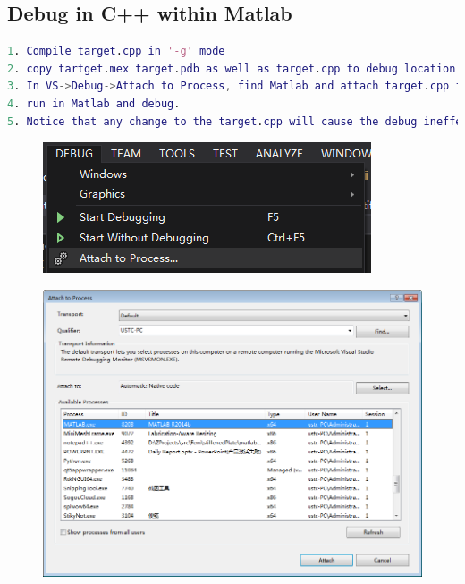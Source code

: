 \documentclass[10pt,a4paper]{article}
\begin{document}
\subsection{Debug in C++ within Matlab}
\begin{lstlisting}[language=matlab]
1. Compile target.cpp in '-g' mode 
2. copy tartget.mex target.pdb as well as target.cpp to debug location
3. In VS->Debug->Attach to Process, find Matlab and attach target.cpp file to matlab.
4. run in Matlab and debug.
5. Notice that any change to the target.cpp will cause the debug ineffective.
\end{lstlisting}

\begin{figure}[h]
	\centering
	\includegraphics[width=0.7\linewidth]{attach_to_matlab}
	\caption{}
	\label{fig:attachtomatlab}
\end{figure}

\begin{figure}[h]
\centering
\includegraphics[width=0.7\linewidth]{attach_to_matlab2}
\caption{}
\label{fig:attachtomatlab2}
\end{figure}
\end{document}
